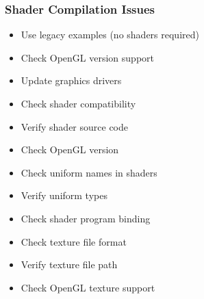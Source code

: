 \documentclass[a4paper,10pt,english,openany,oneside]{sphinxmanual}
\begin{document}
\subsubsection{Shader Compilation Issues}
\label{\detokenize{troubleshooting:shader-compilation-issues}}\begin{description}
\begin{itemize}
\item {} 
\sphinxAtStartPar
Use legacy examples (no shaders required)

\item {} 
\sphinxAtStartPar
Check OpenGL version support

\item {} 
\sphinxAtStartPar
Update graphics drivers

\end{itemize}

\begin{itemize}
\item {} 
\sphinxAtStartPar
Check shader compatibility

\item {} 
\sphinxAtStartPar
Verify shader source code

\item {} 
\sphinxAtStartPar
Check OpenGL version

\end{itemize}

\begin{itemize}
\item {} 
\sphinxAtStartPar
Check uniform names in shaders

\item {} 
\sphinxAtStartPar
Verify uniform types

\item {} 
\sphinxAtStartPar
Check shader program binding

\end{itemize}

\begin{itemize}
\item {} 
\sphinxAtStartPar
Check texture file format

\item {} 
\sphinxAtStartPar
Verify texture file path

\item {} 
\sphinxAtStartPar
Check OpenGL texture support

\end{itemize}

\end{description}
\end{document}
